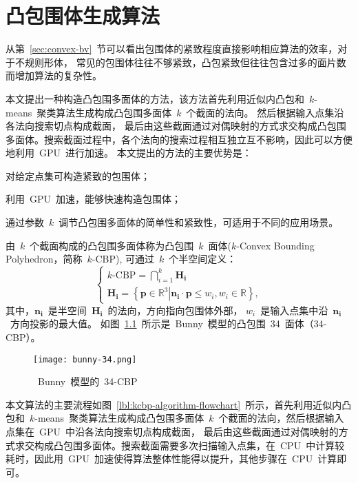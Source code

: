 

\chapter{凸包围体生成算法}
\label{cha:kcbp-construction}
从第~\ref{sec:convex-bv}~节可以看出包围体的紧致程度直接影响相应算法的效率，对于不规则形体， 常见的包围体往往不够紧致，凸包紧致但往往包含过多的面片数而增加算法的复杂性。

本文提出一种构造凸包围多面体的方法，该方法首先利用近似内凸包和~$k$-means~聚类算法生成构成凸包围多面体~$k$~个截面的法向。
然后根据输入点集沿各法向搜索切点构成截面， 最后由这些截面通过对偶映射的方式求交构成凸包围多面体。搜索截面过程中，各个法向的搜索过程相互独立互不影响，因此可以方便地利用~GPU~进行加速。
本文提出的方法的主要优势是：
\begin{inparaenum}[(1)]
\item 对给定点集可构造紧致的包围体；
\item 利用~GPU~加速，能够快速构造包围体；
\item 通过参数~$k$~调节凸包围多面体的简单性和紧致性，可适用于不同的应用场景。
\end{inparaenum}

由~$k$~个截面构成的凸包围多面体称为凸包围~$k$~面体($k$-Convex Bounding Polyhedron，简称~$k$-CBP), 可通过~$k$~个半空间定义：
\begin{equation}
\label{equ:kcbp_definition}
\left\{
\begin{array}{l}
    k\mbox{-CBP} = \mathop  \bigcap \limits_{i = 1}^k \bm{H_i} \\
    \bm{H_i} = \left\{ {\left. {\bm{p} \in {\mathbb{R}^3}} \right| \bm{n_i} \cdot \bm{p} \le {w_i}} , w_i \in \mathbb{R} \right\},
\end{array}
\right.
\end{equation}
其中，$\bm{n_i}$~是半空间~$\bm{H_i}$~的法向，方向指向包围体外部，
$w_i$~是输入点集中沿~$\bm{n_i}$~方向投影的最大值。
如图~\ref{fig:bunny}~所示是~Bunny~模型的凸包围~34~面体（34-CBP）。

\begin{figure}[htbp] 
\centering
  \texttt{[image: bunny-34.png]}
  \caption{~Bunny~模型的~34-CBP }
  \label{fig:bunny}
\end{figure}

本文算法的主要流程如图~\ref{lbl:kcbp-algorithm-flowchart}~所示，首先利用近似内凸包和~$k$-means~聚类算法生成构成凸包围多面体~$k$~个截面的法向，然后根据输入点集在~GPU~中沿各法向搜索切点构成截面，
最后由这些截面通过对偶映射的方式求交构成凸包围多面体。搜索截面需要多次扫描输入点集，在~CPU~中计算较耗时，因此用~GPU~加速使得算法整体性能得以提升，其他步骤在~CPU~计算即可。

